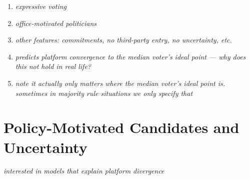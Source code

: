 \documentclass[../../../main.tex]{subfiles}
\begin{document}
\begin{enumerate}
    \item \textit{expressive voting}
    \item \textit{office-motivated politicians}
    \item \textit{other features: commitments, no third-party entry, no uncertainty, etc.}
    \item \textit{predicts platform convergence to the median voter's ideal point --- why does this not hold in real life?}
    \item \textit{note it actually only matters where the median voter's ideal point is. sometimes in majority rule situations we only specify that}
\end{enumerate}

\section{Policy-Motivated Candidates and Uncertainty}

\nocite{calvert1985robustness}
\nocite{wittman1983candidate}
\nocite{bernhardt2009case}

\textit{interested in models that explain platform divergence}
\end{document}
